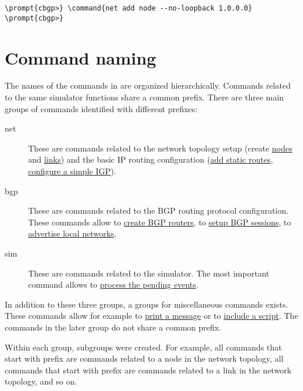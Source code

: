 \begin{Verbatim}[commandchars=\\\{\}]
\prompt{cbgp>} \command{net add node --no-loopback 1.0.0.0}
\prompt{cbgp>}
\end{Verbatim}


\section{Command naming}
\label{sec:user-interface-commands}

The names of the commands in  are organized
hierarchically. Commands related to the same simulator functions share
a common prefix. There are three main groups of commands identified
with different prefixes:

\begin{description}
\item [net]
  These are commands related to the network topology setup
  (create \hyperref[cmd:net_add_node]{nodes} and
  \hyperref[cmd:net_add_link]{links}) and the basic IP routing
  configuration (\hyperref[cmd:net_node_route_add]{add static routes},
  \hyperref[cmd:net_add_domain]{configure a simple IGP}).

\item [bgp]
  These are commands related to the BGP routing protocol
  configuration. These commands allow to
  \hyperref[cmd:bgp_add_router]{create BGP routers}, to
  \hyperref[cmd:bgp_router_add_peer]{setup BGP sessions},  to
  \hyperref[cmd:bgp_router_add_network]{advertise local networks}, 

\item [sim]
  These are commands related to the simulator. The most important
  command allows to \hyperref[cmd:sim_run]{process the pending
    events}.

\end{description}

In addition to these three groups, a groups for miscellaneous commands
exists. These commands allow for example to \hyperref[cmd:print]{print
  a message} or to \hyperref[cmd:include]{include a script}. The
commands in the later group do not share a common prefix.

Within each group, subgroups were created. For example, all commands
that start with prefix  are commands related to a
node in the network topology, all commands that start with prefix
 are commands related to a link in the network
topology, and so on.

